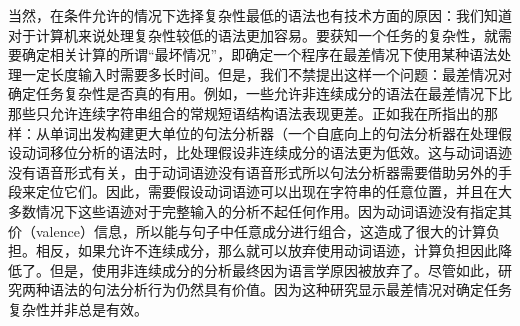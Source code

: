     当然，在条件允许的情况下选择复杂性最低的语法也有技术方面的原因：我们知道对于计算机来说处理复杂性较低的语法更加容易。要获知一个任务的复杂性，就需要确定相关计算的所谓“最坏情况”，即确定一个程序在最差情况下使用某种语法处理一定长度输入时需要多长时间。但是，我们不禁提出这样一个问题：最差情况对确定任务复杂性是否真的有用。例如，一些允许非连续成分的语法在最差情况下比那些只允许连续字符串组合的常规短语结构语法表现更差\citep[\S~8]{Reape91}。正如我在所指出的那样：从单词出发构建更大单位的句法分析器（一个自底向上的句法分析器在处理假设动词移位分析的语法时，比处理假设非连续成分的语法更为低效。这与动词语迹没有语音形式有关，由于动词语迹没有语音形式所以句法分析器需要借助另外的手段来定位它们。因此，需要假设动词语迹可以出现在字符串的任意位置，并且在大多数情况下这些语迹对于完整输入的分析不起任何作用。因为动词语迹没有指定其价（valence）信息，所以能与句子中任意成分进行组合，这造成了很大的计算负担。相反，如果允许不连续成分，那么就可以放弃使用动词语迹，计算负担因此降低了。但是，使用非连续成分的分析最终因为语言学原因被放弃了\citep{Mueller2005c,Mueller2005d,MuellerLehrbuch1,MuellerGS}。尽管如此，研究两种语法的句法分析行为仍然具有价值。因为这种研究显示最差情况对确定任务复杂性并非总是有效。
